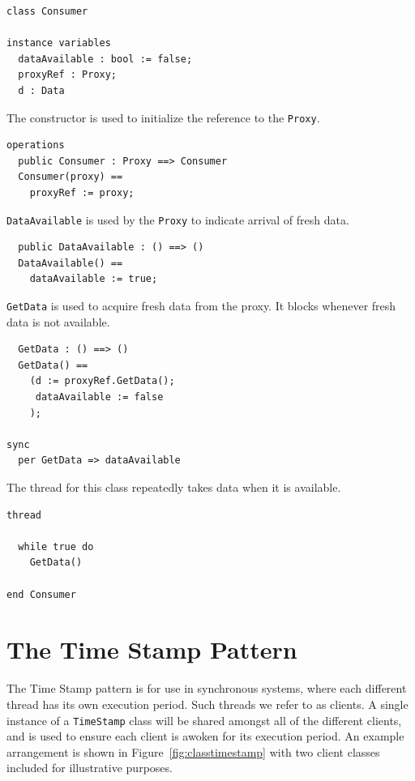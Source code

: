 \documentclass{overturerepchap}
\begin{document}
\begin{lstlisting}
class Consumer

instance variables
  dataAvailable : bool := false;
  proxyRef : Proxy;
  d : Data
\end{lstlisting}

The constructor is used to initialize the reference to the
\texttt{Proxy}.

\begin{lstlisting}
operations
  public Consumer : Proxy ==> Consumer
  Consumer(proxy) ==
    proxyRef := proxy;
\end{lstlisting}

\texttt{DataAvailable} is used by the \texttt{Proxy} to indicate
arrival of fresh data.

\begin{lstlisting}
  public DataAvailable : () ==> ()
  DataAvailable() ==
    dataAvailable := true;
\end{lstlisting}

\texttt{GetData} is used to acquire fresh data from the proxy. It
blocks whenever fresh data is not available.

\begin{lstlisting}
  GetData : () ==> ()
  GetData() ==
    (d := proxyRef.GetData();
     dataAvailable := false
    );

sync
  per GetData => dataAvailable
\end{lstlisting}

The thread for this class repeatedly takes data when it is available.

\begin{lstlisting}
thread

  while true do
    GetData()

end Consumer
\end{lstlisting}

\section{The Time Stamp Pattern}\label{sec:TimeStamp}

The Time Stamp pattern is for use in synchronous systems, where each
different thread has its own execution period. Such threads we refer
to as clients. 
A single instance of a
\texttt{TimeStamp} class will be shared amongst all of the different
clients, and is used to ensure each client is awoken for its execution
period. An example arrangement is shown in
Figure~\ref{fig:classtimestamp} with two client classes included for
illustrative purposes.
\end{document}
